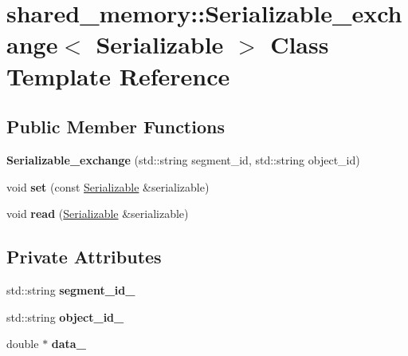 \hypertarget{classshared__memory_1_1Serializable__exchange}{}\section{shared\+\_\+memory\+:\+:Serializable\+\_\+exchange$<$ Serializable $>$ Class Template Reference}
\label{classshared__memory_1_1Serializable__exchange}
\subsection*{Public Member Functions}
\begin{DoxyCompactItemize}
\item 
\mbox{\label{classshared__memory_1_1Serializable__exchange_acb92a032cbc772e4d327d98208b214d3}} 
{\bfseries Serializable\+\_\+exchange} (std\+::string segment\+\_\+id, std\+::string object\+\_\+id)
\item 
\mbox{\label{classshared__memory_1_1Serializable__exchange_a29943c12f26bbd6e876b979d366fd110}} 
void {\bfseries set} (const \hyperlink{classSerializable}{Serializable} \&serializable)
\item 
\mbox{\label{classshared__memory_1_1Serializable__exchange_a3b69842f01b73a15bfefed264b8e3dd3}} 
void {\bfseries read} (\hyperlink{classSerializable}{Serializable} \&serializable)
\end{DoxyCompactItemize}
\subsection*{Private Attributes}
\begin{DoxyCompactItemize}
\item 
\mbox{\label{classshared__memory_1_1Serializable__exchange_a495d9d0320ec199625deed0f1cd0ea20}} 
std\+::string {\bfseries segment\+\_\+id\+\_\+}
\item 
\mbox{\label{classshared__memory_1_1Serializable__exchange_a21968aa2fbfc11fa6ecc298320ebfb9a}} 
std\+::string {\bfseries object\+\_\+id\+\_\+}
\item 
\mbox{\label{classshared__memory_1_1Serializable__exchange_a1923d2803a05846f61ee4738dac10674}} 
double $\ast$ {\bfseries data\+\_\+}
\end{DoxyCompactItemize}


